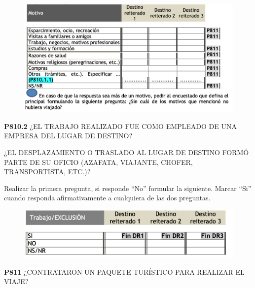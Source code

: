 \documentclass[
  openany]{book}
\begin{document}
\begin{figure}

{\centering \includegraphics[width=1\linewidth]{imagenes/figura6-264} 

}

\end{figure}

\textbf{P810.2} ¿EL TRABAJO REALIZADO FUE COMO EMPLEADO DE UNA EMPRESA DEL LUGAR DE DESTINO?

¿EL DESPLAZAMIENTO O TRASLADO AL LUGAR DE DESTINO FORMÓ PARTE DE SU OFICIO (AZAFATA, VIAJANTE, CHOFER, TRANSPORTISTA, ETC.)?

Realizar la primera pregunta, si responde ``No'' formular la siguiente. Marcar ``Si'' cuando responda afirmativamente a cualquiera de las dos preguntas.

\begin{figure}

{\centering \includegraphics[width=1\linewidth]{imagenes/figura6-265} 

}

\end{figure}

\textbf{P811} ¿CONTRATARON UN PAQUETE TURÍSTICO PARA REALIZAR EL VIAJE?
\end{document}
